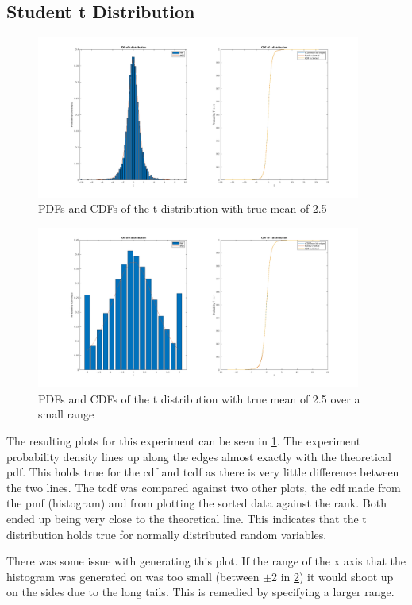 \documentclass[a4paper, 12pt]{article}
\begin{document}
        \subsection{Student t Distribution} \label{sec:tExp}
            \begin{figure}[!h]
                \centering
                \includegraphics[width=0.95\textwidth]{t.png}
                \caption{PDFs and CDFs of the t distribution with true mean of 2.5}
                \label{fig:t}
            \end{figure}
            \begin{figure}[!h]
                \centering
                \includegraphics[width=0.95\textwidth]{tSmallRange.png}
                \caption{PDFs and CDFs of the t distribution with true mean of 2.5 over a small range}
                \label{fig:tSmallRange}
            \end{figure}
            The resulting plots for this experiment can be seen in \cref{fig:t}. The experiment probability density lines up along the edges almost exactly with the theoretical pdf. This holds true for the cdf and tcdf as there is very little difference between the two lines. The tcdf was compared against two other plots, the cdf made from the pmf (histogram) and from plotting the sorted data against the rank. Both ended up being very close to the theoretical line. This indicates that the t distribution holds true for normally distributed random variables.
            \par
            There was some issue with generating this plot. If the range of the x axis that the histogram was generated on was too small (between $\pm$2 in \cref{fig:tSmallRange}) it would shoot up on the sides due to the long tails. This is remedied by specifying a larger range.
\end{document}
